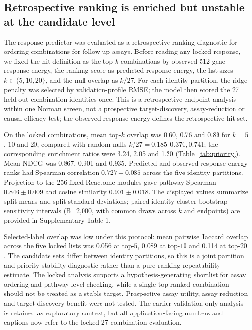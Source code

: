 \documentclass[10pt]{article}
\begin{document}
\subsection{Retrospective ranking is enriched but unstable at the candidate level}
The response predictor was evaluated as a retrospective ranking diagnostic for ordering combinations for follow-up assays. Before reading any locked response, we fixed the hit definition as the top-$k$ combinations by observed 512-gene response energy, the ranking score as predicted response energy, the list sizes $k\in\{5,10,20\}$, and the null overlap as $k/27$. For each identity partition, the ridge penalty was selected by validation-profile RMSE; the model then scored the 27 held-out combination identities once. This is a retrospective endpoint analysis within one Norman screen, not a prospective target-discovery, assay-reduction or causal efficacy test; the observed response energy defines the retrospective hit set.

On the locked combinations, mean top-$k$ overlap was 0.60, 0.76 and 0.89 for $k=5$, $10$ and $20$, compared with random nulls $k/27=0.185,0.370,0.741$; the corresponding enrichment ratios were 3.24, 2.05 and 1.20 (Table~\ref{tab:priority}). Mean NDCG was 0.867, 0.901 and 0.935. Predicted and observed response-energy ranks had Spearman correlation $0.727\pm0.085$ across the five identity partitions. Projection to the 256 fixed Reactome modules gave pathway Spearman $0.846\pm0.009$ and cosine similarity $0.901\pm0.018$. The displayed values summarize split means and split standard deviations; paired identity-cluster bootstrap sensitivity intervals (B=2,000, with common draws across $k$ and endpoints) are provided in Supplementary Table 1.

Selected-label overlap was low under this protocol: mean pairwise Jaccard overlap across the five locked lists was 0.056 at top-$5$, 0.089 at top-$10$ and 0.114 at top-$20$. The candidate sets differ between identity partitions, so this is a joint partition and priority stability diagnostic rather than a pure ranking-repeatability estimate. The locked analysis supports a hypothesis-generating shortlist for assay ordering and pathway-level checking, while a single top-ranked combination should not be treated as a stable target. Prospective assay utility, assay reduction and target-discovery benefit were not tested. The earlier validation-only analysis is retained as exploratory context, but all application-facing numbers and captions now refer to the locked 27-combination evaluation.
\end{document}
